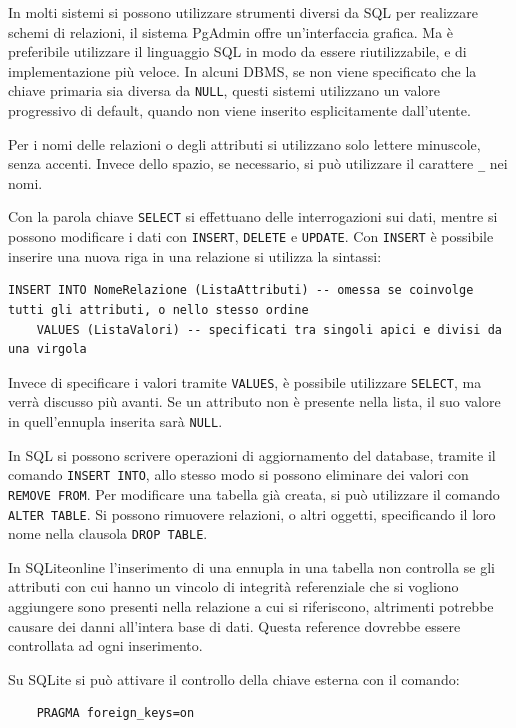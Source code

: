 \documentclass{article}
\numberwithin{equation}{subsection}
\begin{document}
In molti sistemi si possono utilizzare strumenti diversi da SQL per realizzare schemi di relazioni, il sistema PgAdmin offre un'interfaccia grafica. Ma è preferibile utilizzare il linguaggio SQL in modo da 
essere riutilizzabile, e di implementazione più veloce. 
In alcuni DBMS, se non viene specificato che la chiave primaria sia diversa da \verb|NULL|, questi sistemi utilizzano un valore progressivo di default, quando non viene inserito esplicitamente dall'utente.  


Per i nomi delle relazioni o degli attributi si utilizzano solo lettere minuscole, senza accenti. Invece dello spazio, se necessario, si può utilizzare il carattere \verb|_| nei nomi. 

Con la parola chiave \verb|SELECT| si effettuano delle interrogazioni sui dati, mentre si possono modificare i dati con \verb|INSERT|, \verb|DELETE| e \verb|UPDATE|. 
Con \verb|INSERT| è possibile inserire una nuova riga in una relazione si utilizza la sintassi:
\begin{verbatim}
INSERT INTO NomeRelazione (ListaAttributi) -- omessa se coinvolge tutti gli attributi, o nello stesso ordine
    VALUES (ListaValori) -- specificati tra singoli apici e divisi da una virgola
\end{verbatim}
Invece di specificare i valori tramite \verb|VALUES|, è possibile utilizzare \verb|SELECT|, ma verrà discusso più avanti. Se un attributo non è presente nella lista, il suo valore in quell'ennupla inserita sarà 
\verb|NULL|. 


In SQL si possono scrivere operazioni di aggiornamento del database, tramite il comando \verb|INSERT INTO|, allo stesso modo si possono eliminare dei valori con 
\verb|REMOVE FROM|. Per modificare una tabella già creata, si può utilizzare il comando \verb|ALTER TABLE|. Si possono rimuovere relazioni, o altri oggetti, specificando il loro nome nella clausola \verb|DROP TABLE|. 


In SQLiteonline l'inserimento di una ennupla in una tabella non controlla se gli attributi con cui hanno un vincolo di integrità referenziale che si vogliono aggiungere sono presenti nella relazione 
a cui si riferiscono, altrimenti potrebbe causare dei danni all'intera base di dati. Questa reference dovrebbe essere controllata ad ogni inserimento. 

Su SQLite si può attivare il controllo della chiave esterna con il comando:
\begin{verbatim}
    PRAGMA foreign_keys=on
\end{verbatim}
\end{document}
